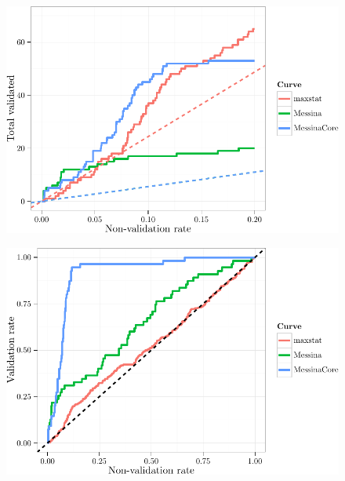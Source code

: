 \documentclass[dissertation.tex]{subfiles}
\begin{document}
\begin{figure}[!htbp]
\centering
\includegraphics[width=.7\linewidth]{analysis/messina/figure/07-E3-E3-val-detcurves-1}
\caption[]{}\label{fig:mess-val-detabs}
\end{figure}

\begin{figure}[!htbp]
\centering
\includegraphics[width=.7\linewidth]{analysis/messina/figure/07-E3-E3-val-detcurves-2}
\caption[]{}\label{fig:mess-val-detrel}
\end{figure}
\end{document}
